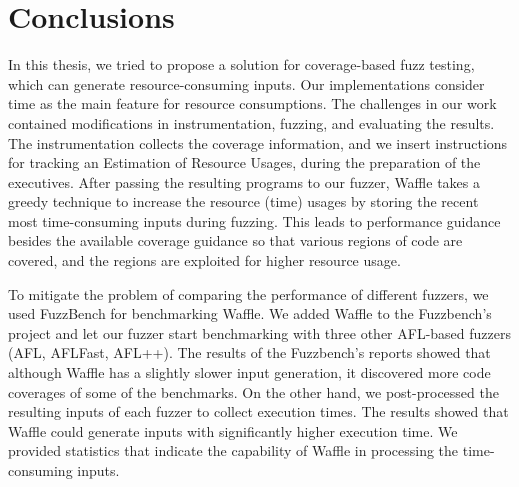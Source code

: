 \section{Conclusions}
\label{sec:conclusions}

In this thesis, we tried to propose a solution for coverage-based fuzz testing, which can generate resource-consuming inputs. Our implementations consider time as the main feature for resource consumptions. The challenges in our work contained modifications in instrumentation, fuzzing, and evaluating the results. The instrumentation collects the coverage information, and we insert instructions for tracking an Estimation of Resource Usages, during the preparation of the executives. After passing the resulting programs to our fuzzer, Waffle takes a greedy technique to increase the resource (time) usages by storing the recent most time-consuming inputs during fuzzing. This leads to performance guidance besides the available coverage guidance so that various regions of code are covered, and the regions are exploited for higher resource usage.


To mitigate the problem of comparing the performance of different fuzzers, we used FuzzBench for benchmarking Waffle. We added Waffle to the Fuzzbench's project and let our fuzzer start benchmarking with three other AFL-based fuzzers (AFL, AFLFast, AFL++). The results of the Fuzzbench's reports showed that although Waffle has a slightly slower input generation, it discovered more code coverages of some of the benchmarks. On the other hand, we post-processed the resulting inputs of each fuzzer to collect execution times. The results showed that Waffle could generate inputs with significantly higher execution time. We provided statistics that indicate the capability of Waffle in processing the time-consuming inputs.
